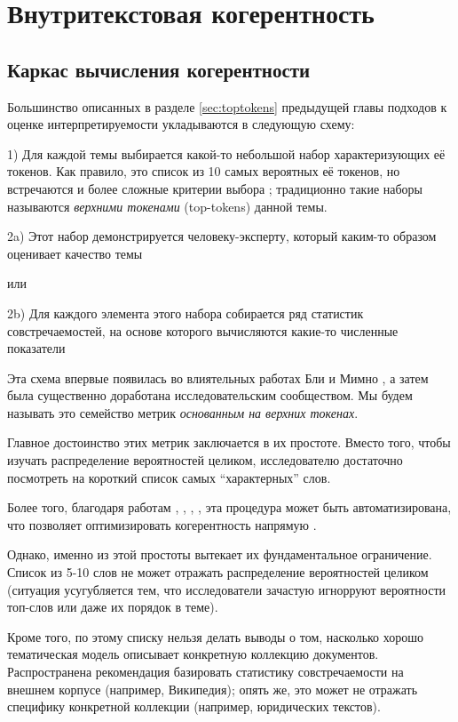 \chapter{Внутритекстовая когерентность}
\label{chap:coh}

\section{Каркас вычисления когерентности}

Большинство описанных в разделе \ref{sec:toptokens} предыдущей главы подходов к оценке интерпретируемости укладываются в следующую схему:

1) Для каждой темы выбирается какой-то небольшой набор характеризующих её токенов. Как правило, это список из 10 самых вероятных её токенов, но встречаются и более сложные критерии выбора \cite{blei2009topic}\cite{ldavis2014}\cite{boydcare}\cite{frex}; традиционно такие наборы называются \textit{верхними токенами} (top-tokens) данной темы.

2a) Этот набор демонстрируется человеку-эксперту, который каким-то образом оценивает качество темы

или

2b) Для каждого элемента этого набора собирается ряд статистик совстречаемостей, на основе которого вычисляются какие-то численные показатели

Эта схема впервые появилась во влиятельных работах Бли \cite{rtl} \cite{mrtl} и Мимно \cite{mimno2011}, а затем была существенно доработана исследовательским сообществом. Мы будем называть это семейство метрик \textit{основанным на верхних токенах}. 

Главное достоинство этих метрик заключается в их простоте. Вместо того, чтобы изучать распределение вероятностей целиком, исследователю достаточно посмотреть на короткий список самых ``характерных'' слов.

Более того, благодаря работам \cite{mrtl}, \cite{mimno2011}, \cite{aletras2013evaluating}, \cite{roder2015exploring}, эта процедура может быть автоматизирована, что позволяет оптимизировать когерентность напрямую \cite{4keys}.

Однако, именно из этой простоты вытекает их фундаментальное ограничение. Список из 5-10 слов не может отражать распределение вероятностей целиком (ситуация усугубляется тем, что исследователи зачастую игнорруют вероятности топ-слов или даже их порядок в теме). 

Кроме того, по этому списку нельзя делать выводы о том, насколько хорошо тематическая модель описывает конкретную коллекцию документов. Распространена рекомендация базировать статистику совстречаемости на внешнем корпусе (например, Википедия); опять же, это может не отражать специфику конкретной коллекции (например, юридических текстов).

